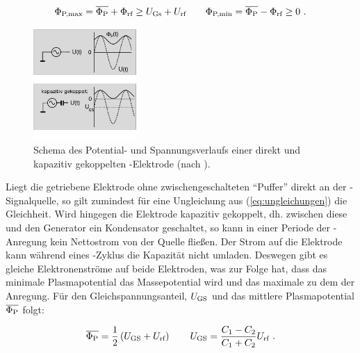           \begin{align}
            \Phi_\text{P,max}=\overline{\Phi_\text{P}}+\Phi_\text{rf}\geq U_\text{Gs}+U_\text{rf} \quad \quad \Phi_\text{P,min}=\overline{\Phi_\text{P}}-\Phi_\text{rf}\geq 0\, \, . \label{eq:ungleichungen}
          \end{align}

          \begin{figure}
            \centering
            \vspace{-0.5cm}
            \includegraphics[width=0.35\textwidth,height=0.35\textwidth]{figs/kapazitivekopplungohneschemapiel.png}
            \caption{ Schema des Potential- und Spannungsverlaufs einer direkt und kapazitiv gekoppelten -Elektrode (nach \cite{Piel10}).}
            \label{img:kapazitivgekoppelt}
          \end{figure}

        Liegt die getriebene Elektrode ohne zwischengeschalteten ``Puffer'' direkt an der -Signalquelle, so gilt zumindest f\"ur eine Ungleichung aus (\ref{eq:ungleichungen}) die Gleichheit. Wird hingegen die Elektrode kapazitiv gekoppelt, dh. zwischen diese und den Generator ein Kondensator geschaltet, so kann in einer Periode der -Anregung kein Nettostrom von der Quelle flie{\ss}en. Der Strom auf die Elektrode kann während eines -Zyklus die Kapazität nicht umladen. Deswegen gibt es gleiche Elektronenstr\"ome auf beide Elektroden, was zur Folge hat, dass das minimale Plasmapotential das Massepotential wird und das maximale zu dem der Anregung. F\"ur den Gleichspannungsanteil,  $U_\text{GS}$ und das mittlere Plasmapotential $\overline{\Phi_\text{P}}$ folgt:

          \begin{align}
            \overline{\Phi_\text{P}}=\frac{1}{2}\left(U_\text{GS}+U_\text{rf}\right) \quad \quad U_\text{GS}=\frac{C_\text{1}-C_\text{2}}{C_\text{1}+C_\text{2}}U_\text{rf} \,\, .\label{eq:selfbiaszwei} 
          \end{align}

